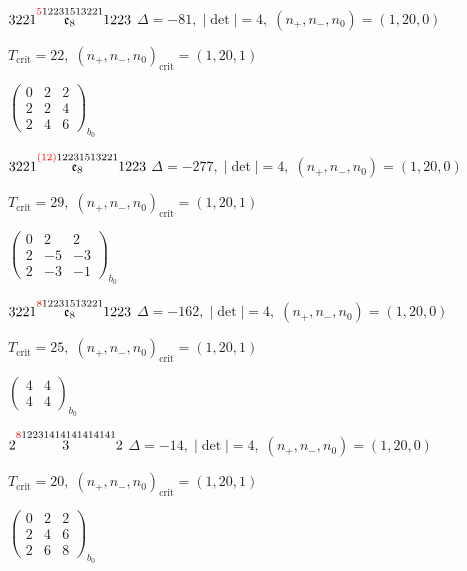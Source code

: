\documentclass[10pt]{article}
\begin{document}
$3221\overset{\textcolor{red}{5}12231513221}{\mathfrak{e}_8}1223$ \quad $\Delta=-81,\; |\det|=4,\; (n_+,n_-,n_0)=(1,20,0)$

\hspace{1em}$T_{\text{crit}}=22,\; (n_+,n_-,n_0)_{\text{crit}}=(1,20,1)$

\hspace{2em}$\left(\begin{smallmatrix}0 & 2 & 2 \\ 2 & 2 & 4 \\ 2 & 4 & 6\end{smallmatrix}\right)_{\!b_0}$

$3221\overset{\textcolor{red}{(12)}12231513221}{\mathfrak{e}_8}1223$ \quad $\Delta=-277,\; |\det|=4,\; (n_+,n_-,n_0)=(1,20,0)$

\hspace{1em}$T_{\text{crit}}=29,\; (n_+,n_-,n_0)_{\text{crit}}=(1,20,1)$

\hspace{2em}$\left(\begin{smallmatrix}0 & 2 & 2 \\ 2 & -5 & -3 \\ 2 & -3 & -1\end{smallmatrix}\right)_{\!b_0}$

$3221\overset{\textcolor{red}{8}12231513221}{\mathfrak{e}_8}1223$ \quad $\Delta=-162,\; |\det|=4,\; (n_+,n_-,n_0)=(1,20,0)$

\hspace{1em}$T_{\text{crit}}=25,\; (n_+,n_-,n_0)_{\text{crit}}=(1,20,1)$

\hspace{2em}$\left(\begin{smallmatrix}4 & 4 \\ 4 & 4\end{smallmatrix}\right)_{\!b_0}$

\smallskip

$2\overset{\textcolor{red}{8}12231414141414141}{3}2$ \quad $\Delta=-14,\; |\det|=4,\; (n_+,n_-,n_0)=(1,20,0)$

\hspace{1em}$T_{\text{crit}}=20,\; (n_+,n_-,n_0)_{\text{crit}}=(1,20,1)$

\hspace{2em}$\left(\begin{smallmatrix}0 & 2 & 2 \\ 2 & 4 & 6 \\ 2 & 6 & 8\end{smallmatrix}\right)_{\!b_0}$
\end{document}
